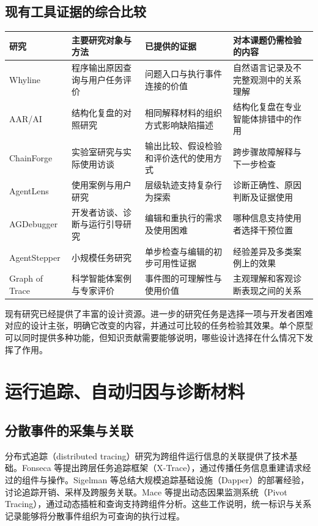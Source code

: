 \subsection{现有工具证据的综合比较}

\begin{table}[H]
  \centering
  \small
  \begin{tabularx}{\textwidth}{Y Y Y Y}
    \toprule
    研究 & 主要研究对象与方法 & 已提供的证据 & 对本课题仍需检验的内容 \\
    \midrule
    Whyline\cite{ref07} & 程序输出原因查询与用户任务评价 & 问题入口与执行事件连接的价值 & 自然语言记录及不完整观测中的关系理解 \\
    AAR/AI\cite{ref04} & 结构化复盘的对照研究 & 相同解释材料的组织方式影响缺陷描述 & 结构化复盘在专业智能体排错中的作用 \\
    ChainForge\cite{arawjo2024chainforge} & 实验室研究与实际使用访谈 & 输出比较、假设检验和评价迭代的使用方式 & 跨步骤故障解释与下一步检查 \\
    AgentLens\cite{ref22} & 使用案例与用户研究 & 层级轨迹支持复杂行为探索 & 诊断正确性、原因判断及证据使用 \\
    AGDebugger\cite{ref02} & 开发者访谈、诊断与运行引导研究 & 编辑和重执行的需求及使用困难 & 哪种信息支持使用者选择干预位置 \\
    AgentStepper\cite{ref18} & 小规模任务研究 & 单步检查与编辑的初步可用性证据 & 经验差异及多类案例上的效果 \\
    Graph of Trace\cite{ref24} & 科学智能体案例与专家评价 & 事件图的可理解性与使用价值 & 主观理解和客观诊断表现之间的关系 \\
    \bottomrule
  \end{tabularx}
\end{table}

现有研究已经提供了丰富的设计资源。进一步的研究任务是选择一项与开发者困难对应的设计主张，明确它改变的内容，并通过可比较的任务检验其效果。单个原型可以同时提供多种功能，但知识贡献需要能够说明，哪些设计选择在什么情况下发挥了作用。

\section{运行追踪、自动归因与诊断材料}

\subsection{分散事件的采集与关联}

分布式追踪（distributed tracing）研究为跨组件运行信息的关联提供了技术基础。Fonseca 等\cite{ref30}提出跨层任务追踪框架（X-Trace），通过传播任务信息重建请求经过的组件与操作。Sigelman 等\cite{ref32}总结大规模追踪基础设施（Dapper）的部署经验，讨论追踪开销、采样及跨服务关联。Mace 等\cite{ref31}提出动态因果监测系统（Pivot Tracing），通过动态插桩和查询支持跨组件分析。这些工作说明，统一标识与关系记录能够将分散事件组织为可查询的执行过程。

